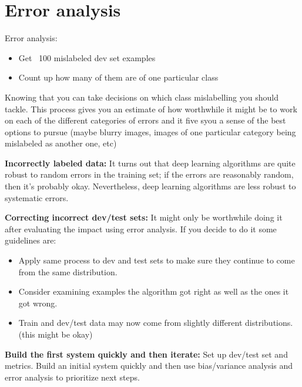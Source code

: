 




\section*{Error analysis}

Error analysis:
\begin{itemize}
    \item Get ~100 mislabeled dev set examples
    \item Count up how many of them are of one particular class
\end{itemize}
Knowing that you can take decisions on which class mislabelling you should tackle. This
process gives you an estimate of how worthwhile it might be to work on each of 
the different categories of errors and it five syou a sense of the best options to pursue
(maybe blurry images, images of one particular category being mislabeled as another one, etc)

\textbf{Incorrectly labeled data:} It turns out that deep learning algorithms 
are quite robust to random errors in the training set; if the errors are reasonably 
random, then it's probably okay. Nevertheless, deep learning algorithms are less 
robust to systematic errors.

\textbf{Correcting incorrect dev/test sets:} It might only be worthwhile doing it after
evaluating the impact using error analysis. If you decide to do it some guidelines are:

\begin{itemize}
    \item Apply same process to dev and test sets to make sure they continue to come 
    from the same distribution. 
    \item Consider examining examples the algorithm got right as well as the ones it got 
    wrong.
    \item Train and dev/test data may now come from slightly different distributions. (this 
    might be okay)
\end{itemize}

\textbf{Build the first system quickly and then iterate:} Set up dev/test set and metrics.
Build an initial system quickly and then use bias/variance analysis and error analysis
to prioritize next steps.

